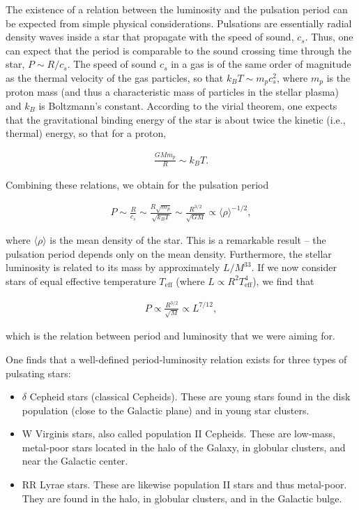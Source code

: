 \documentclass[a4paper,11pt]{article}
\begin{document}
{\noindent}The existence of a relation between the luminosity and the pulsation period can be expected from simple physical considerations. Pulsations are essentially radial density waves inside a star that propagate with the speed of sound, $c_s$. Thus, one can expect that the period is comparable to the sound crossing time through the star, $P\sim R/c_s$. The speed of sound $c_s$ in a gas is of the same order of magnitude as the thermal velocity of the gas particles, so that $k_BT\sim m_pc_s^2$, where $m_p$ is the proton mass (and thus a characteristic mass of particles in the stellar plasma) and $k_B$ is Boltzmann's constant. According to the virial theorem, one expects that the gravitational binding energy of the star is about twice the kinetic (i.e., thermal) energy, so that for a proton,

\begin{align*}
    \frac{GMm_p}{R} \sim k_BT.
\end{align*}

{\noindent}Combining these relations, we obtain for the pulsation period

\begin{align*}
    P\sim\frac{R}{c_s}\sim\frac{R\sqrt{m_p}}{\sqrt{k_BT}} \sim\frac{R^{3/2}}{\sqrt{GM}} \propto \langle\rho\rangle^{-1/2},
\end{align*}

{\noindent}where $\langle\rho\rangle$ is the mean density of the star. This is a remarkable result -- the pulsation period depends only on the mean density. Furthermore, the stellar luminosity is related to its mass by approximately $L/M^33$. If we now consider stars of equal effective temperature $T_\mathrm{eff}$ (where $L\propto R^2T_\mathrm{eff}^4$), we find that

\begin{align*}
    P \propto \frac{R^{3/2}}{\sqrt{M}} \propto L^{7/12},
\end{align*}

{\noindent}which is the relation between period and luminosity that we were aiming for.

{\noindent}One finds that a well-defined period-luminosity relation exists for three types of pulsating stars:

\begin{itemize}
    \item $\delta$ Cepheid stars (classical Cepheids). These are young stars found in the disk population (close to the Galactic plane) and in young star clusters.
    \item W Virginis stars, also called population II Cepheids. These are low-mass, metal-poor stars located in the halo of the Galaxy, in globular clusters, and near the Galactic center.
    \item RR Lyrae stars. These are likewise population II stars and thus metal-poor. They are found in the halo, in globular clusters, and in the Galactic bulge.
\end{itemize}
\end{document}
